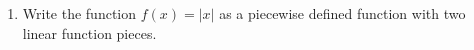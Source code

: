 \begin{enumerate}
\item Write the function $f(x) = |x|$ as a piecewise defined function with two linear function pieces.

\vfill

%
%
%
%
%
%



\end{enumerate}

